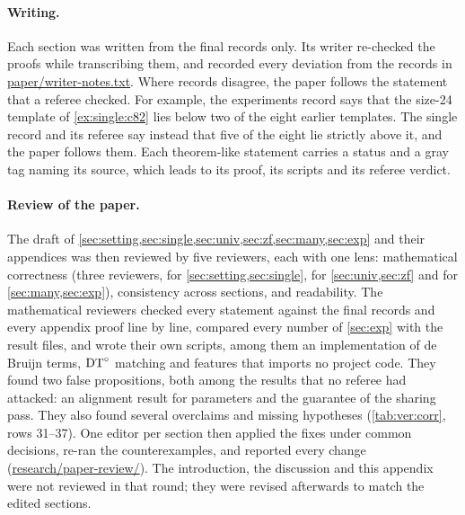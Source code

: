 \paragraph{Writing.} Each section was written from the final records only. Its writer re-checked the proofs while
transcribing them, and recorded every deviation from the records in \url{paper/writer-notes.txt}. Where records
disagree, the paper follows the statement that a referee checked. For example, the experiments record says that the size-24
template of \cref{ex:single:c82} lies below two of the eight earlier templates. The single record and its referee say
instead that five of the eight lie strictly above it, and the paper follows them. Each theorem-like statement carries
a status and a gray tag naming its source, which leads to its proof, its scripts and its referee verdict.

\paragraph{Review of the paper.} The draft of \cref{sec:setting,sec:single,sec:univ,sec:zf,sec:many,sec:exp} and their
appendices was then reviewed by five reviewers, each with one lens: mathematical correctness (three reviewers, for
\cref{sec:setting,sec:single}, for \cref{sec:univ,sec:zf} and for \cref{sec:many,sec:exp}), consistency across
sections, and readability. The mathematical reviewers checked every statement against the final records and every
appendix proof line by line, compared every number of \cref{sec:exp} with the result files, and wrote their own scripts,
among them an implementation of de Bruijn terms, $\mathrm{DT}^{\circ}$ matching and features that imports no project code. They found
two false propositions, both among the results that no referee had attacked: an alignment result for parameters and the
guarantee of the sharing pass. They also found several overclaims and missing hypotheses (\cref{tab:ver:corr}, rows
31--37). One editor per section then applied the fixes under common decisions, re-ran the counterexamples, and reported
every change (\url{research/paper-review/}). The introduction, the discussion and this appendix were not reviewed in that
round; they were revised afterwards to match the edited sections.

